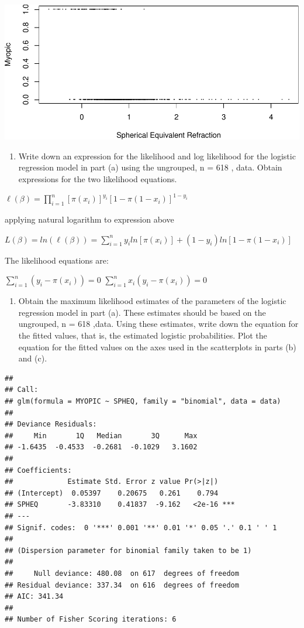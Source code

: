 \documentclass[]{article}
\begin{document}
\begin{center}\includegraphics{HomeworkWeek1_files/figure-latex/unnamed-chunk-1-1} \end{center}

\begin{enumerate}
\def\labelenumi{\alph{enumi}.}
\setcounter{enumi}{2}
\itemsep1pt\parskip0pt
\item
  Write down an expression for the likelihood and log likelihood for the
  logistic regression model in part (a) using the ungrouped, n = 618 ,
  data. Obtain expressions for the two likelihood equations.
\end{enumerate}

$\ell(\beta)=\prod_{i=1}^{n}[\pi(x_i)]^{y_i}[1-\pi(1-x_i)]^{1-y_i}$

applying natural logarithm to expression above

$L(\beta)=ln(\ell(\beta))=\sum_{i=1}^{n}y_iln[\pi(x_i)]+(1-y_i)ln[1-\pi(1-x_i)]$

The likelihood equations are:

$\sum_{i=1}^{n}(y_i-\pi(x_i))=0$ $\sum_{i=1}^{n}x_i(y_i-\pi(x_i))=0$

\begin{enumerate}
\def\labelenumi{\alph{enumi}.}
\setcounter{enumi}{3}
\itemsep1pt\parskip0pt
\item
  Obtain the maximum likelihood estimates of the parameters of the
  logistic regression model in part (a). These estimates should be based
  on the ungrouped, n = 618 ,data. Using these estimates, write down the
  equation for the fitted values, that is, the estimated logistic
  probabilities. Plot the equation for the fitted values on the axes
  used in the scatterplots in parts (b) and (c).
\end{enumerate}

\begin{verbatim}
## 
## Call:
## glm(formula = MYOPIC ~ SPHEQ, family = "binomial", data = data)
## 
## Deviance Residuals: 
##     Min       1Q   Median       3Q      Max  
## -1.6435  -0.4533  -0.2681  -0.1029   3.1602  
## 
## Coefficients:
##             Estimate Std. Error z value Pr(>|z|)    
## (Intercept)  0.05397    0.20675   0.261    0.794    
## SPHEQ       -3.83310    0.41837  -9.162   <2e-16 ***
## ---
## Signif. codes:  0 '***' 0.001 '**' 0.01 '*' 0.05 '.' 0.1 ' ' 1
## 
## (Dispersion parameter for binomial family taken to be 1)
## 
##     Null deviance: 480.08  on 617  degrees of freedom
## Residual deviance: 337.34  on 616  degrees of freedom
## AIC: 341.34
## 
## Number of Fisher Scoring iterations: 6
\end{verbatim}
\end{document}

